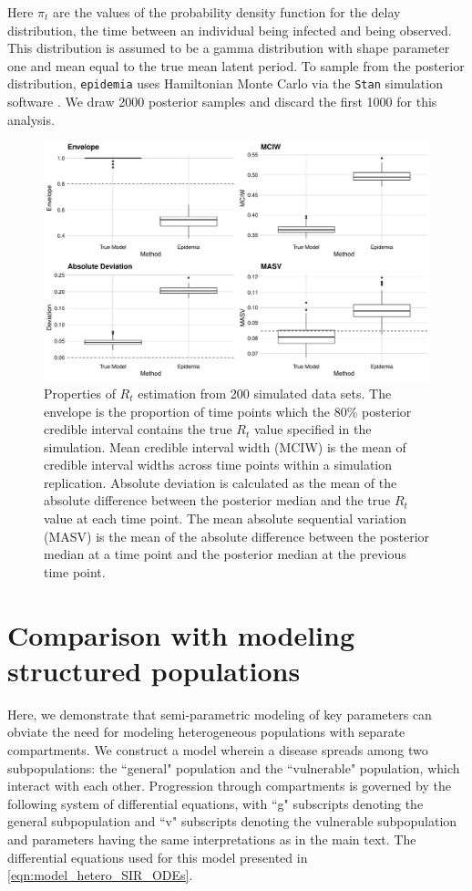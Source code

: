 Here $\pi_{t}$ are the values of the probability density function for the delay distribution, the time between an individual being infected and being observed.
This distribution is assumed to be a gamma distribution with shape parameter one and mean equal to the true mean latent period. 
To sample from the posterior distribution, \texttt{epidemia} uses Hamiltonian Monte Carlo via the \texttt{Stan} simulation software \citep{rstan}.
We draw 2000 posterior samples and discard the first 1000 for this analysis.


\begin{figure}[htbp]
    \centering
    \includegraphics[width=1.0\columnwidth]{rt_comparison_metrics_plot}
    \caption{Properties of \( R_t \) estimation from 200 simulated data sets.
    The envelope is the proportion of time points which the 80\% posterior credible interval contains the true \( R_t \) value specified in the simulation.
    Mean credible interval width (MCIW) is the mean of credible interval widths across time points within a simulation replication.
    Absolute deviation is calculated as the mean of the absolute difference between the posterior median and the true \( R_t \) value at each time point.
    The mean absolute sequential variation (MASV) is the mean of the absolute difference between the posterior median at a time point and the posterior median at the previous time point.}
    \label{ch_4:fig:rt_comparison_metrics_plot}
\end{figure}

\section{Comparison with modeling structured populations}
\label{ch_4:sec:hetero}
Here, we demonstrate that semi-parametric modeling of key parameters can obviate the need for modeling heterogeneous populations with separate compartments.
We construct a model wherein a disease spreads among two subpopulations: the ``general" population and the ``vulnerable" population, which interact with each other.
Progression through compartments is governed by the following system of differential equations, with ``g" subscripts denoting the general subpopulation and ``v" subscripts denoting the vulnerable subpopulation and parameters having the same interpretations as in the main text.
The differential equations used for this model presented in \eqref{eqn:model_hetero_SIR_ODEs}.


